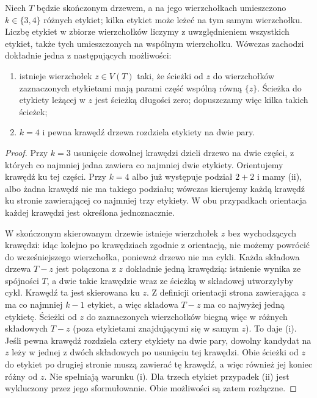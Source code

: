 \begin{lemat}
\label{lem:tg-kuratowski-tree-terminals}
Niech $T$ będzie skończonym drzewem,
a na jego wierzchołkach umieszczono
$k\in\{3,4\}$ różnych etykiet;
kilka etykiet może leżeć
na tym samym wierzchołku.
Liczbę etykiet w zbiorze wierzchołków liczymy
z uwzględnieniem wszystkich etykiet, także tych
umieszczonych na wspólnym wierzchołku.
Wówczas zachodzi dokładnie jedna
z następujących możliwości:
\begin{enumerate}[label=(\roman*)]
\item istnieje wierzchołek $z\in V(T)$
taki, że ścieżki od $z$ do wierzchołków
zaznaczonych etykietami mają parami część wspólną
równą $\{z\}$. Ścieżka do etykiety leżącej w $z$
jest ścieżką długości zero; dopuszczamy więc kilka
takich ścieżek;
\item $k=4$ i pewna krawędź drzewa
rozdziela etykiety na dwie pary.
\end{enumerate}
\end{lemat}
\begin{proof}
Przy $k=3$ usunięcie dowolnej
krawędzi dzieli drzewo na dwie
części, z których co najmniej
jedna zawiera co najmniej
dwie etykiety. Orientujemy
krawędź ku tej części.
Przy $k=4$ albo już
występuje podział $2+2$
i mamy (ii), albo żadna
krawędź nie ma takiego
podziału; wówczas
kierujemy każdą krawędź
ku stronie zawierającej
co najmniej trzy etykiety.
W obu przypadkach
orientacja każdej krawędzi
jest określona jednoznacznie.

W skończonym skierowanym
drzewie istnieje wierzchołek
$z$ bez wychodzących krawędzi:
idąc kolejno po krawędziach
zgodnie z orientacją,
nie możemy powrócić do
wcześniejszego wierzchołka,
ponieważ drzewo nie ma cykli.
Każda składowa drzewa $T-z$ jest połączona
z $z$ dokładnie jedną krawędzią: istnienie wynika
ze spójności $T$, a dwie takie krawędzie wraz ze
ścieżką w składowej utworzyłyby cykl. Krawędź ta
jest skierowana ku $z$. Z definicji orientacji
strona zawierająca $z$ ma co najmniej $k-1$ etykiet,
a więc składowa $T-z$ ma co najwyżej jedną etykietę. Ścieżki od $z$
do zaznaczonych wierzchołków
biegną więc w różnych
składowych $T-z$
(poza etykietami znajdującymi
się w samym $z$).
To daje (i).
Jeśli pewna krawędź rozdziela cztery etykiety na dwie
pary, dowolny kandydat na $z$ leży w jednej z dwóch
składowych po usunięciu tej krawędzi. Obie ścieżki
od $z$ do etykiet po drugiej stronie muszą zawierać
tę krawędź, a więc również jej koniec różny od $z$.
Nie spełniają warunku (i). Dla trzech etykiet
przypadek (ii) jest wykluczony przez jego sformułowanie.
Obie możliwości są zatem rozłączne.
\end{proof}

